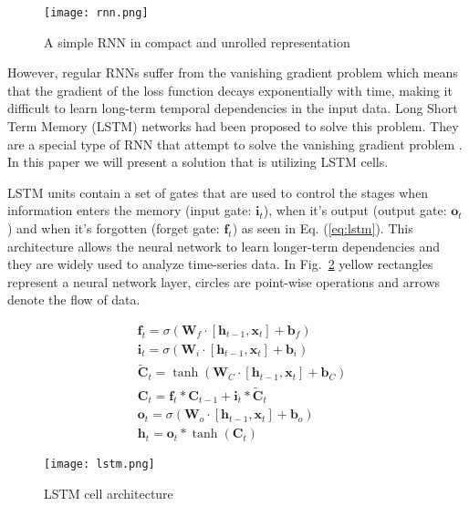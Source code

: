 \documentclass[conference]{IEEEtran}
\begin{document}
\begin{figure}[tbp]
\centerline{\texttt{[image: rnn.png]}}
\caption{A simple RNN in compact and unrolled representation\cite{colahweb}}
\label{fig_rnn}
\end{figure}

However, regular RNNs suffer from the vanishing gradient problem which means that the gradient of the loss function decays exponentially with time, making it difficult to learn long-term temporal dependencies in the input data. \cite{razvan} Long Short Term Memory (LSTM) networks had been proposed to solve this problem. They are a special type of RNN that attempt to solve the vanishing gradient problem \cite{hochreiter}. In this paper we will present a solution that is utilizing LSTM cells. 

LSTM units contain a set of gates that are used to control the stages when information enters the memory (input gate: $\mathbf{i}_{t}$), when it's output (output gate: $\mathbf{o}_{t}$) and when it's forgotten (forget gate: $\mathbf{f}_{t}$) as seen in Eq. (\ref{eq:lstm}). This architecture allows the neural network to learn longer-term dependencies and they are widely used to analyze time-series data. \cite{chung} In Fig.~\ref{lstm_arch} yellow rectangles represent a neural network layer, circles are point-wise operations and arrows denote the flow of data. 

\begin{equation} \label{eq:lstm}
\begin{aligned}
& \mathbf{f}_{t} = \sigma( \mathbf{W}_{f} \cdot [ \mathbf{h}_{t-1}, \mathbf{x}_{t} ] + \mathbf{b}_{f} )  \\
& \mathbf{i}_{t} = \sigma( \mathbf{W}_{i} \cdot [ \mathbf{h}_{t-1}, \mathbf{x}_{t} ] + \mathbf{b}_{i} ) \\
& \mathbf{\widetilde{C}}_{t} = \tanh( \mathbf{W}_{C} \cdot [ \mathbf{h}_{t-1}, \mathbf{x}_{t} ] + \mathbf{b}_{C} ) \\
& \mathbf{C}_{t} = \mathbf{f}_{t} \ast \mathbf{C}_{t-1} + \mathbf{i}_{t} \ast \mathbf{\widetilde{C}}_{t} \\
& \mathbf{o}_{t} = \sigma( \mathbf{W}_{o} \cdot [ \mathbf{h}_{t-1}, \mathbf{x}_{t} ] + \mathbf{b}_{o} ) \\
& \mathbf{h}_{t} = \mathbf{o}_{t} \ast \tanh(\mathbf{C}_{t})
\end{aligned}
\end{equation}

\begin{figure}[tbp]
\centerline{\texttt{[image: lstm.png]}}
\caption{LSTM cell architecture\cite{colahweb}}
\label{lstm_arch}
\end{figure}
\end{document}
